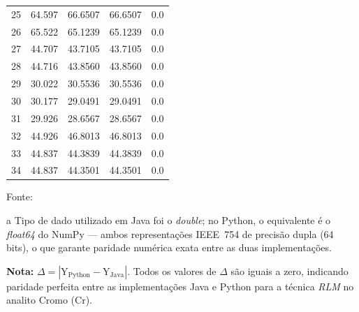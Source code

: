 \begin{table}[H]
\begin{threeparttable}
{\begin{tabular}{
    S[table-format=2.0]
    S[table-format=2.3]
    S[table-format=2.4]
    S[table-format=2.4]
    S[table-format=1.1]
}
25  & 64.597  & 66.6507  & 66.6507  & 0.0 \\
26  & 65.522  & 65.1239  & 65.1239  & 0.0 \\
27  & 44.707  & 43.7105  & 43.7105  & 0.0 \\
28  & 44.716  & 43.8560  & 43.8560  & 0.0 \\
29  & 30.022  & 30.5536  & 30.5536  & 0.0 \\
30  & 30.177  & 29.0491  & 29.0491  & 0.0 \\
31  & 29.926  & 28.6567  & 28.6567  & 0.0 \\
32  & 44.926  & 46.8013  & 46.8013  & 0.0 \\
33  & 44.837  & 44.3839  & 44.3839  & 0.0 \\
34  & 44.837  & 44.3501  & 44.3501  & 0.0 \\
\bottomrule
\end{tabular}%
}
\begin{center}
\begin{minipage}{0.85\linewidth}
\begin{tablenotes}
\footnotesize
\item Fonte:~\oautor
\item[a] Tipo de dado utilizado em Java foi o \textit{double}; no Python,
o equivalente é o \textit{float64} do NumPy — ambos representações IEEE~754
de precisão dupla (64 bits), o que garante paridade numérica exata entre as
duas implementações.
\item \textbf{Nota:} $\Delta = |\text{Y}_{\text{Python}} - \text{Y}_{\text{Java}}|$.
Todos os valores de $\Delta$ são iguais a zero, indicando paridade
perfeita entre as implementações Java e Python para a técnica \textit{RLM}
no analito Cromo (Cr).
\end{tablenotes}
\end{minipage}
\end{center}
\end{threeparttable}
\end{table}

